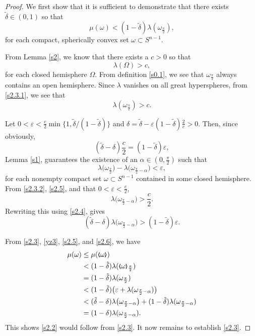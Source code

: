 \documentclass{cpamart1}     %
\theoremstyle{definition}
\theoremstyle{remark}
\newcommand{\sn}{S^{n-1}}
\newcommand{\bla}{\raise.2ex\hbox{$\scriptstyle\pmb \langle$}}
\newcommand{\bra}{\raise.2ex\hbox{$\scriptstyle\pmb \rangle$}}
\begin{document}
\begin{proof}
We first show that it is sufficient to demonstrate that there exists $\tilde\delta\in (0,1)$
so that
\begin{equation}\label{s2.3}
\mu(\omega)<(1-\tilde\delta) \lambda(\omega_{\frac\pi2}),
\end{equation}
for each compact, spherically convex set $\omega\subset S^{n-1}$.

From Lemma \ref{s2}, we know that there exists a $c>0$ so that
\begin{equation}\label{s2.3.1}
\lambda (\Omega)>c,
\end{equation}
for each closed hemisphere $\Omega$.
From definition \eqref{s0.1},  we see that $\omega_\frac\pi2$ always contains an open hemisphere.
 Since
$\lambda$ vanishes on all great hyperspheres,  from \eqref{s2.3.1}, we see that
\begin{equation}\label{s2.3.2}
\lambda(\omega_\frac\pi2) > c.
\end{equation}

Let $0<\varepsilon<\frac {c}2 \min\{1,\tilde\delta/(1-\tilde\delta)\}$ and
$\delta =\tilde\delta - \varepsilon(1-\tilde\delta)\frac2{c}>0$. Then, since obviously,
\begin{equation}\label{s2.4}
(\tilde\delta -\delta)\frac{c}2 = (1-\tilde\delta)\varepsilon,
\end{equation}
Lemma \ref{s1}, guarantees the existence of an $\alpha \in (0,\frac\pi2)$ such that
\begin{equation}\label{s2.5}
\lambda\big(\omega_\frac\pi2\big) - \lambda\big(\omega_{\frac\pi2-\alpha}\big)
<\varepsilon,
\end{equation}
for each nonempty compact set $\omega\subset\sn$ contained in some closed hemisphere. From
\eqref{s2.3.2}, \eqref{s2.5}, and that $0<\varepsilon<\frac {c}2$,
\begin{equation*}
\lambda\big(\omega_{\frac\pi2-\alpha}\big) > \frac{c}2.
\end{equation*}
Rewriting this using \eqref{s2.4}, gives
\begin{equation}\label{s2.6}
(\tilde\delta -\delta) \lambda\big(\omega_{\frac\pi2-\alpha}\big)
> (1-\tilde\delta)\varepsilon.
\end{equation}

From \eqref{s2.3}, \eqref{yz3}, \eqref{s2.5}, and \eqref{s2.6}, we have
\begin{align*}
\mu(\omega)
&\leq \mu(\bla \omega\bra)\\
&<(1-\tilde\delta) \lambda(\bla\omega\bra_\frac\pi2)\\
&=(1-\tilde\delta) \lambda(\omega_\frac\pi2) \\
&<(1-\tilde\delta) \big(\varepsilon + \lambda(\omega_{\frac\pi2-\alpha})\big) \\
&< (\tilde\delta -\delta) \lambda\big(\omega_{\frac\pi2-\alpha}\big)
  + (1-\tilde\delta) \lambda(\omega_{\frac\pi2-\alpha}) \\
&=(1-\delta) \lambda (\omega_{\frac\pi2-\alpha}).
\end{align*}
This shows \eqref{s2.2} would follow from \eqref{s2.3}. It now remains to establish \eqref{s2.3}.


\end{proof}
\end{document}
